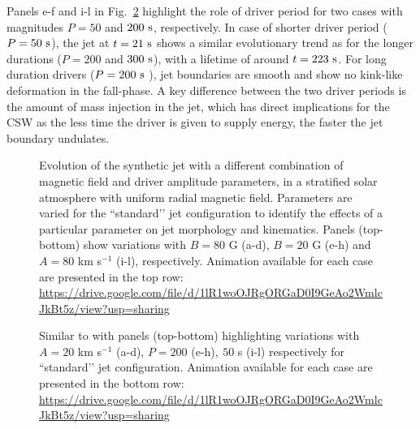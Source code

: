 %
Panels e-f and i-l in Fig.~\ref{paramter_scan_two} highlight the role of driver period for two cases with magnitudes $P = 50$ and $200~\rm{s}$, respectively. In case of shorter driver period ($P = 50 ~\rm{s}$), the jet at $t = 21~\rm{s}$ shows a similar evolutionary trend as for the longer durations ($P = 200$ and $300~\rm{s}$), with a lifetime of around $t = 223~\rm{s}$. For long duration drivers ($P = 200~\rm{s}$ ), jet boundaries are smooth and show no kink-like deformation in the fall-phase. A key difference between the two driver periods is the amount of mass injection in the jet, which has direct implications for the CSW as the less time the driver is given to supply energy, the faster the jet boundary undulates. \np
\begin{figure}
\captionsetup[subfigure]{labelformat=empty}
\centering
{}
\caption{Evolution of the synthetic jet with a different combination of magnetic field and driver amplitude parameters, in a stratified solar atmosphere with uniform radial magnetic field. Parameters are varied for the ``standard’’ jet configuration to identify the effects of a particular parameter on jet morphology and kinematics. Panels (top-bottom) show variations with $B = 80$ G (a-d), $B = 20$ G  (e-h) and $A = 80$ km s$^{-1}$ (i-l), respectively. Animation available for each case are presented in the top row: \url{https://drive.google.com/file/d/1lR1woOJRgORGaD0I9GeAo2WmlcJkBt5z/view?usp=sharing} }
\label{paramter_scan_one}
\end{figure}
\begin{figure}
\captionsetup[subfigure]{labelformat=empty}
\centering
{}
\caption{Similar to  with panels (top-bottom) highlighting variations with $A = 20$ km s$^{-1}$ (a-d), $P = 200$ (e-h)$,~50$ s (i-l) respectively for ``standard’’ jet configuration. Animation available for each case are presented in the bottom row: \url{https://drive.google.com/file/d/1lR1woOJRgORGaD0I9GeAo2WmlcJkBt5z/view?usp=sharing}}
\label{paramter_scan_two}
\end{figure}
